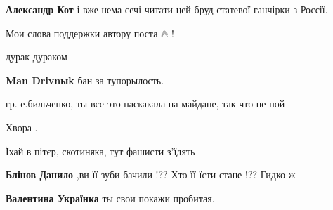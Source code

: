 \begin{itemize}
\begin{itemize}

\textbf{Александр Кот} і вже нема сечі читати цей бруд статевої ганчірки з Россії. 🤣
\end{itemize}


Мои слова поддержки автору поста 🔥 !

\begin{itemize}

дурак дураком


\textbf{Man Drivnыk} бан за тупорылость.
\end{itemize}


гр. е.бильченко, ты все это наскакала на майдане, так что не ной


Хвора .


Їхай в пітєр, скотиняка, тут фашисти з'їдять

\begin{itemize}

\textbf{Блінов Данило} ,ви її зуби бачили !?? Хто її їсти стане !?? Гидко ж 🤮


\textbf{Валентина Українка} ты свои покажи пробитая.



\end{itemize}
\end{itemize}
